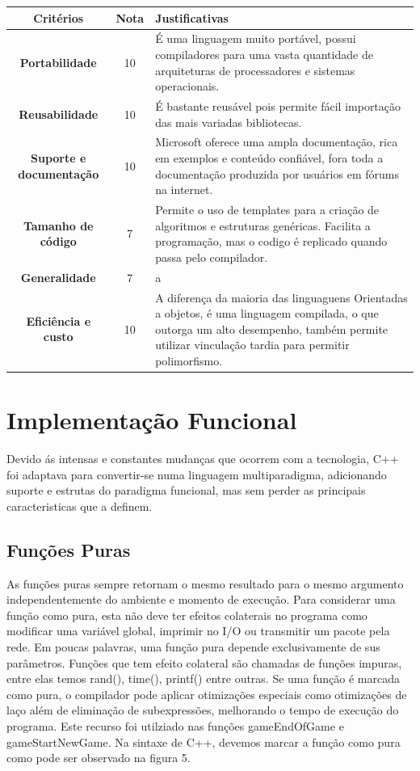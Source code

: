 \documentclass[rel_mlp]{iiufrgs}
\begin{document}
 \begin{center}
\begin{tabular}{ |c|c|p{80mm} }
\hline
	\textbf{Critérios} & \textbf{Nota} & \textbf{Justificativas} \\
\hline
\textbf{Portabilidade} & 10 & É uma linguagem muito portável, possui compiladores para uma vasta quantidade de arquiteturas de processadores e sistemas operacionais. \\
\textbf{Reusabilidade} & 10 & É bastante reusável pois permite fácil importação das mais variadas bibliotecas. \\
\textbf{Suporte e documentação} & 10 & Microsoft oferece uma ampla documentação, rica em exemplos e conteúdo confiável, fora toda a documentação produzida por usuários em fórums na internet. \\
\textbf{Tamanho de código} & 7 & Permite o uso de templates para a criação de algoritmos e estruturas genéricas. Facilita a programação, mas o codigo é replicado quando passa pelo compilador. \\
\textbf{Generalidade} & 7 & a \\
\textbf{Eficiência e custo} & 10 & A diferença da maioria das linguaguens Orientadas a objetos, é uma linguagem compilada, o que outorga um alto desempenho, também permite utilizar vinculação tardia para permitir polimorfismo. \\
\hline
\end{tabular}
\end{center}

\chapter{ Implementação Funcional} \label{Implementação Funcional} 

Devido ás intensas e constantes mudanças que ocorrem com a tecnologia, C++ foi adaptava para convertir-se numa linguagem multiparadigma, adicionando suporte e estrutas do paradigma funcional, mas sem perder as principais caracteristicas que a definem. 

 \section{Funções Puras}
	As funções puras sempre retornam o mesmo resultado para o mesmo argumento independentemente do ambiente e momento de execução. Para considerar uma função como pura, esta não deve ter efeitos colaterais no programa como modificar uma variável global, imprimir no I/O ou transmitir um pacote pela rede. Em poucas palavras, uma função pura depende exclusivamente de sus parâmetros.
	Funções que tem efeito colateral são chamadas de funções impuras, entre elas temos rand(), time(), printf() entre outras.
	Se uma função é marcada como pura, o compilador pode aplicar otimizações especiais como otimizações de laço além de eliminação de subexpressões, melhorando o tempo de execução do programa.
	Este recurso foi utilziado nas funções gameEndOfGame e gameStartNewGame. Na sintaxe de C++, devemos marcar a função como pura como pode ser observado na figura 5. 
	
\end{document}
